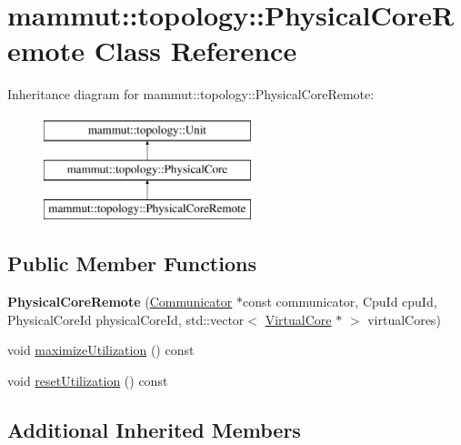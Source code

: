 \hypertarget{classmammut_1_1topology_1_1PhysicalCoreRemote}{\section{mammut\-:\-:topology\-:\-:Physical\-Core\-Remote Class Reference}
\label{classmammut_1_1topology_1_1PhysicalCoreRemote}
}
Inheritance diagram for mammut\-:\-:topology\-:\-:Physical\-Core\-Remote\-:\begin{figure}[H]
\begin{center}
\leavevmode
\includegraphics[height=3.000000cm]{classmammut_1_1topology_1_1PhysicalCoreRemote}
\end{center}
\end{figure}
\subsection*{Public Member Functions}
\begin{DoxyCompactItemize}
\item 
\hypertarget{classmammut_1_1topology_1_1PhysicalCoreRemote_a87e4c8dda013d6501584f2feda4e0a06}{{\bfseries Physical\-Core\-Remote} (\hyperlink{classmammut_1_1Communicator}{Communicator} $\ast$const communicator, Cpu\-Id cpu\-Id, Physical\-Core\-Id physical\-Core\-Id, std\-::vector$<$ \hyperlink{classmammut_1_1topology_1_1VirtualCore}{Virtual\-Core} $\ast$ $>$ virtual\-Cores)}\label{classmammut_1_1topology_1_1PhysicalCoreRemote_a87e4c8dda013d6501584f2feda4e0a06}

\item 
void \hyperlink{classmammut_1_1topology_1_1PhysicalCoreRemote_ad0207a63493483caedafd82faa354c40}{maximize\-Utilization} () const 
\item 
void \hyperlink{classmammut_1_1topology_1_1PhysicalCoreRemote_a5f76fa7a3b9c61597ad06a2fce8db675}{reset\-Utilization} () const 
\end{DoxyCompactItemize}
\subsection*{Additional Inherited Members}


